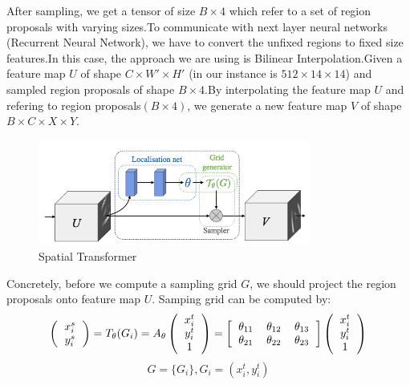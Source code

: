 \documentclass[12pt,a4paper]{report}
\begin{document}
 
After  sampling, we get a tensor of size $B\times 4$ which refer to a set of  region proposals with varying sizes.To communicate with next layer neural networks (Recurrent Neural Network), we have to convert the unfixed regions to fixed size features.In this case, the approach we are using is Bilinear Interpolation.Given a feature map $U$ of shape $C\times W'\times H'$ (in our instance is $512\times 14\times 14$) and sampled region proposals of shape $B\times 4$.By interpolating the feature map $U$ and refering to region proposals$(B\times 4)$, we generate a new feature map $V$ of shape $B\times C\times X\times Y$. \\
\begin{figure}[h]
\centering
\includegraphics[width=0.8\textwidth]{transform.png}
\caption{Spatial Transformer}
\end{figure}


Concretely, before we compute a sampling grid $G$, we should project the region proposals onto feature map $U$.
Samping grid can be computed by:\\
\[ 
\left (
  \begin{tabular}{ccc}
  $x_i^s$ \\
  $y _i^s$
  \end{tabular}
\right ) =T_{\theta}(G_i)=A_{\theta}
\left (
  \begin{tabular}{ccc}
  $x_i^t$ \\
  $y _i^t$ \\
  1
  \end{tabular}
\right )=
\left [
  \begin{tabular}{ccc}
  $\theta_{11}$ &  $\theta_{12}$ &   $\theta_{13}$  \\
   $\theta_{21}$ &  $\theta_{22}$ &   $\theta_{23}$ 

  \end{tabular}
\right ] 
\left (
  \begin{tabular}{ccc}
  $x_i^t$ \\
  $y _i^t$ \\
  1
  \end{tabular}
\right )
\]
$$G=\{G_i\},G_i=(x_i^t,y_i^t)$$
\end{document}
